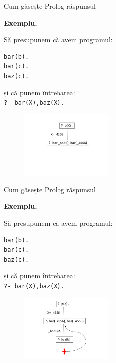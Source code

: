 \documentclass[xcolor=pdftex,romanian,colorlinks]{beamer}
\begin{document}

\begin{frame}[fragile]{Cum găsește Prolog răspunsul}

\textbf{\color{True} Exemplu.} 
\begin{multicols}{2}
Să presupunem că avem programul: 
\begin{verbatim}
bar(b). 
bar(c). 
baz(c).
\end{verbatim}
și că punem întrebarea: \\
{\color{blue}\texttt{?- bar(X),baz(X).}}
\columnbreak
\begin{figure}[h]
    \includegraphics[width=0.4\textwidth]{images/bar1}
\end{figure}
\end{multicols}

\end{frame}

\begin{frame}[fragile]{Cum găsește Prolog răspunsul}



\textbf{\color{True} Exemplu.} 
\begin{multicols}{2}
Să presupunem că avem programul: 
\begin{verbatim}
bar(b). 
bar(c). 
baz(c).
\end{verbatim}
și că punem întrebarea: \\
{\color{blue}\texttt{?- bar(X),baz(X).}}
\columnbreak
\begin{figure}[h]
    \includegraphics[width=0.4\textwidth]{images/bar2}
\end{figure}
\end{multicols}

\end{frame}
\end{document}
